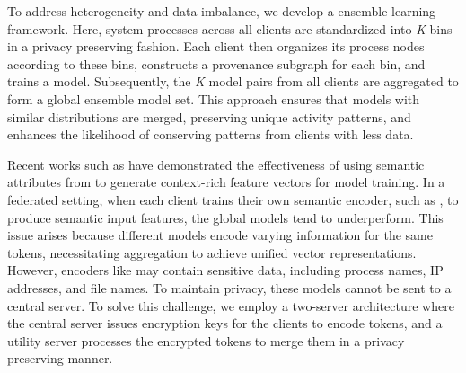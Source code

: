 To address heterogeneity and data imbalance, we develop a \gnnshort ensemble learning framework. Here, system processes across all clients are standardized into \textit{K} bins in a privacy preserving fashion. Each client then organizes its process nodes according to these bins, constructs a provenance subgraph for each bin, and trains a \gnnshort model. Subsequently, the \textit{K} model pairs from all clients are aggregated to form a global ensemble model set. This approach ensures that models with similar distributions are merged, preserving unique activity patterns, and enhances the likelihood of conserving patterns from clients with less data.

Recent works such as \flash have demonstrated the effectiveness of using semantic attributes from \logs to generate context-rich feature vectors for model training. In a federated setting, when each client trains their own semantic encoder, such as \wordvec, to produce semantic input features, the global \gnnshort models tend to underperform. This issue arises because different models encode varying information for the same tokens, necessitating aggregation to achieve unified vector representations. However, encoders like \wordvec may contain sensitive data, including process names, IP addresses, and file names. To maintain privacy, these models cannot be sent to a central server. To solve this challenge, we employ a two-server architecture where the central server issues encryption keys for the clients to encode \wordvec tokens, and a utility server processes the encrypted tokens to merge them in a privacy preserving manner.




